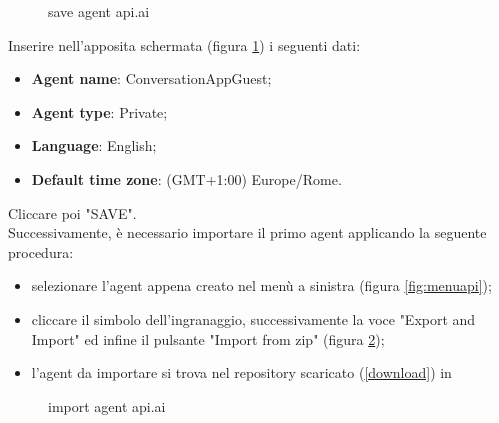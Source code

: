 \begin{figure}[h]
	\caption{save agent api.ai}\label{fig:saveAgent}
\end{figure}
Inserire nell'apposita schermata (figura \ref{fig:saveAgent}) i seguenti dati:
\begin{itemize}
	\item \textbf{Agent name}: ConversationAppGuest;
	\item \textbf{Agent type}: Private;
	\item \textbf{Language}: English;
	\item \textbf{Default time zone}: (GMT+1:00) Europe/Rome.
\end{itemize}
Cliccare poi "SAVE".\\
Successivamente, è necessario importare il primo agent applicando la seguente procedura:
\begin{itemize}
	\item selezionare l'agent appena creato nel menù a sinistra (figura \ref{fig:menuapi});
	\item cliccare il simbolo dell'ingranaggio, successivamente la voce "Export and Import" ed infine il pulsante "Import from zip" (figura \ref{fig:importAgent});
	\item l'agent da importare si trova nel repository scaricato (\ref{download}) in\\ 
\end{itemize}
\begin{figure}[h]
	\caption{import agent api.ai}\label{fig:importAgent}
\end{figure}

